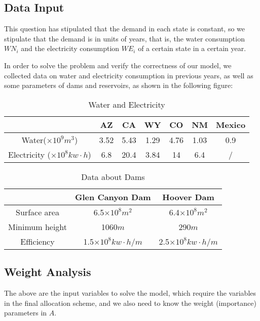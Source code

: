 \documentclass{mcmthesis}
\begin{document}
\subsection{Data Input}
This question has stipulated that the demand in each state is constant, so we stipulate that the demand is in units of years, that is, the water consumption $WN_i$ and the electricity consumption $WE_i$ of a certain state in a certain year. 

In order to solve the problem and verify the correctness of our model, we collected data on water and electricity consumption in previous years, as well as some parameters of dams and reservoirs, as shown in the following figure:

\begin{table}[h]
	\centering
	\caption{Water and Electricity}
	\begin{tabular}{ccccccc}
		\hline
		& AZ   & CA   & WY   & CO   & NM   & Mexico \\
		\hline
		Water($\times10^9m^3$)             & 3.52 & 5.43 & 1.29 & 4.76 & 1.03 & 0.9    \\
		Electricity ($\times10^8kw\cdot h$) & 6.8  & 20.4 & 3.84 & 14   & 6.4  &   /  \\
		\hline  
	\end{tabular}
\end{table}

\begin{table}[h]
	\centering
	\caption{Data about Dams}
	\begin{tabular}{ccc}
		\hline
		& Glen Canyon Dam            & Hoover Dam               \\
		\hline
		Surface area   & 6.5$\times10^8m^2$         & 6.4$\times10^8m^2$       \\
		Minimum height & 1060$m$                      & 290$m$                     \\
		Efficiency     & 1.5$\times10^8kw\cdot h /m$ & 2.5$\times10^8kw\cdot h /m$\\
		\hline
	\end{tabular}
\end{table}

\subsection{Weight Analysis}
The above are the input variables to solve the model, which require the variables in the final allocation scheme, and we also need to know the weight (importance) parameters in $A$.
\end{document}
